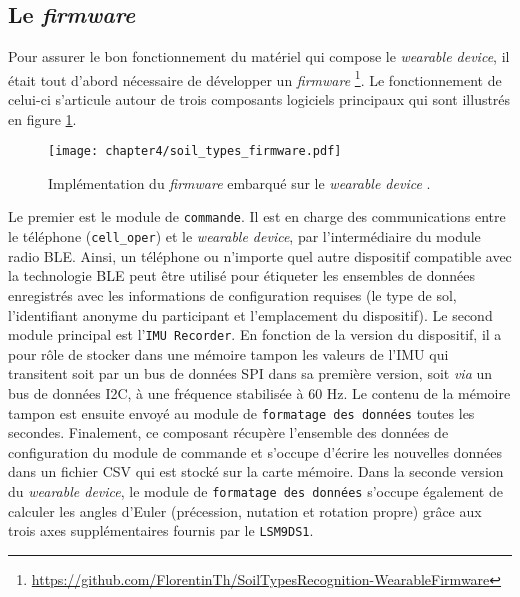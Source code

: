 \subsection{Le \textit{firmware}}

Pour assurer le bon fonctionnement du matériel qui compose le \textit{wearable device}, il était tout d'abord nécessaire de développer un \textit{firmware} \footnote{\url{https://github.com/FlorentinTh/SoilTypesRecognition-WearableFirmware}}. Le fonctionnement de celui-ci s'articule autour de trois composants logiciels principaux qui sont illustrés en figure \ref{fig:soil_types_firmware}.

\begin{figure}[H]
	\centering
	\texttt{[image: chapter4/soil\_types\_firmware.pdf]}
        \caption[Implémentation du \textit{firmware} embarqué sur le \textit{wearable device}.]{Implémentation du \textit{firmware} embarqué sur le \textit{wearable device} \citep{Thullier2017}.}
	\label{fig:soil_types_firmware}
\end{figure}

Le premier est le module de \texttt{commande}. Il est en charge des communications entre le téléphone (\texttt{cell\_oper}) et le \textit{wearable device}, par l'intermédiaire du module radio \acs{BLE}. Ainsi, un téléphone ou n'importe quel autre dispositif compatible avec la technologie \acs{BLE} peut être utilisé pour étiqueter les ensembles de données enregistrés avec les informations de configuration requises (le type de sol, l'identifiant anonyme du participant et l'emplacement du dispositif). Le second module principal est l'\texttt{\acs{IMU} Recorder}. En fonction de la version du dispositif, il a pour rôle de stocker dans une mémoire tampon les valeurs de l'\acs{IMU} qui transitent soit par un bus de données \ac{SPI} dans sa première version, soit \textit{via} un bus de données \ac{I2C}, à une fréquence stabilisée à 60 Hz. Le contenu de la mémoire tampon est ensuite envoyé au module de \texttt{formatage des données} toutes les secondes. Finalement, ce composant récupère l'ensemble des données de configuration du module de commande et s'occupe d'écrire les nouvelles données dans un fichier \ac{CSV} qui est stocké sur la carte mémoire. Dans la seconde version du \textit{wearable device}, le module de \texttt{formatage des données} s'occupe également de calculer les angles d'Euler (précession, nutation et rotation propre) grâce aux trois axes supplémentaires fournis par le \texttt{LSM9DS1}.


